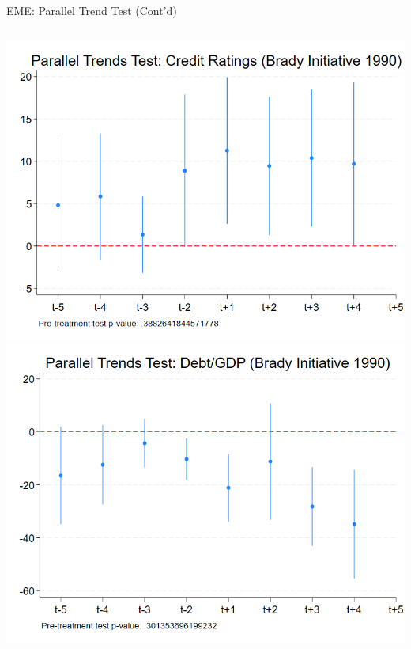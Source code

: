 \documentclass{beamer}
\begin{document}
\begin{frame}{EME: Parallel Trend Test (Cont'd)}
\begin{columns}[T]
\begin{column}{0.45\textwidth}
      \includegraphics[width=0.9\linewidth]{figures/PT_Brady_Ratings.png}
      \includegraphics[width=0.9\linewidth]{figures/PT_Brady_Debt.png}
    \end{column}
  \end{columns}
\end{frame}
\end{document}
